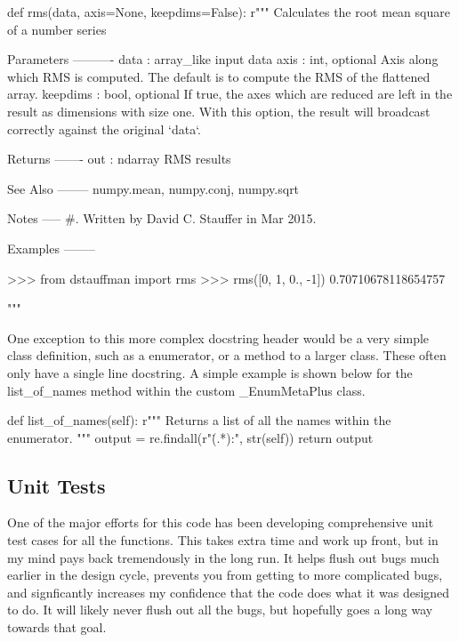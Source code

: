 \documentclass[12pt]{article}
\begin{document}
\begin{Python}
def rms(data, axis=None, keepdims=False):
    r"""
    Calculates the root mean square of a number series

    Parameters
    ----------
    data : array_like
        input data
    axis : int, optional
        Axis along which RMS is computed. The default is to compute the RMS of the flattened array.
    keepdims : bool, optional
        If true, the axes which are reduced are left in the result as dimensions with size one.
        With this option, the result will broadcast correctly against the original `data`.

    Returns
    -------
    out : ndarray
        RMS results

    See Also
    --------
    numpy.mean, numpy.conj, numpy.sqrt

    Notes
    -----
    #.  Written by David C. Stauffer in Mar 2015.

    Examples
    --------

    >>> from dstauffman import rms
    >>> rms([0, 1, 0., -1])
    0.70710678118654757

    """
\end{Python}

One exception to this more complex docstring header would be a very simple class definition, such as a enumerator, or a method to a larger class.  These often only have a single line docstring.  A simple example is shown below for the list\_of\_names method within the custom \_EnumMetaPlus class.

\begin{Python}
    def list_of_names(self):
        r"""
        Returns a list of all the names within the enumerator.
        """
        output = re.findall(r"\.(.*):", str(self))
        return output
\end{Python}

\subsection{Unit Tests}\label{h2:Unit_tests}
One of the major efforts for this code has been developing comprehensive unit test cases for all the functions.  This takes extra time and work up front, but in my mind pays back tremendously in the long run.  It helps flush out bugs much earlier in the design cycle, prevents you from getting to more complicated bugs, and signficantly increases my confidence that the code does what it was designed to do.  It will likely never flush out all the bugs, but hopefully goes a long way towards that goal.
\end{document}
